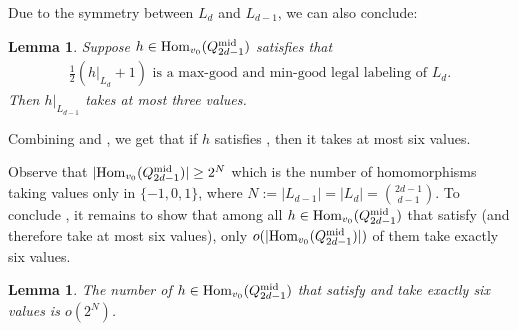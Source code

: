 \documentclass{amsart}
\newtheorem{lem}[thm]{Lemma}
\theoremstyle{definition}
\newcommand{\md}{\mathrm{mid}}
\newcommand{\0}[0]{\emptyset}
\newcommand{\Hom}[0]{\mbox{\rm{Hom}}}
\begin{document}
Due to the symmetry between $L_d$ and $L_{d-1}$, we can also conclude:

\begin{lem}\label{lem:three-2}
    Suppose $h \in \Hom_{v_0}(Q_{2d-1}^{\md})$ satisfies that
\begin{align}\label{eq:typical-max-min-good-2}
    \text{$\frac{1}{2}(h|_{L_{d}}+1)$ is a  max-good and min-good legal labeling of $L_{d}$.}
\end{align}
Then $h|_{L_{d-1}}$ takes at most three values.  
\end{lem}

Combining  and , we get that if $h$ satisfies , then  it takes at most six values.


Observe that $|\Hom_{v_0}(Q_{2d-1}^{\md})|\geq 2^N$ which is the number of homomorphisms taking values only in $\{-1, 0, 1\}$,  where $N := |L_{d-1}| = |L_d| = \binom{2d-1}{d-1}$.  To conclude , it remains to show that among all $h \in \Hom_{v_0}(Q_{2d-1}^{\md})$ that satisfy  (and therefore take at most six values), only $o(|\Hom_{v_0}(Q_{2d-1}^{\md})|)$  of them take exactly six values. 


\begin{lem}\label{lem:six-to-five}
    The number of $h \in \Hom_{v_0}(Q_{2d-1}^{\md})$ that satisfy  and take exactly six values is $o(2^N)$.
\end{lem}
\end{document}
